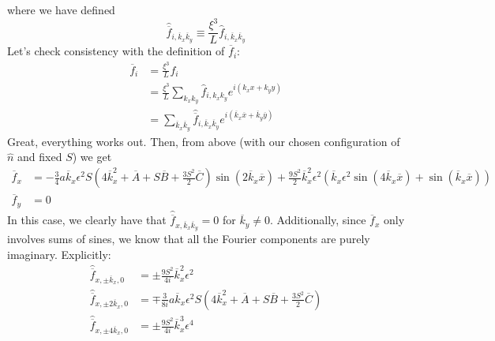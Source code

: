 \documentclass[reqno]{article}
\begin{document}
	where we have defined
	\begin{equation}
		\hat{\overline{f}}_{i, \overline{k}_x \overline{k}_y} 
		\equiv \frac{\xi^3}{L} \hat{f}_{i, \overline{k}_x \overline{k}_y}
	\end{equation}
	Let's check consistency with the definition of $\overline{f}_i$:
	\begin{equation}
	\begin{split}
		\overline{f}_i
		&= \frac{\xi^3}{L} f_i \\
		&= \frac{\xi^3}{L} \sum_{k_x k_y}
		\hat{f}_{i, k_x k_y} e^{i\left( k_x x + k_y y \right)} \\
		&= \sum_{\overline{k}_x \overline{k}_y}
		\hat{\overline{f}}_{i, \overline{k}_x \overline{k}_y}
		e^{i \left( \overline{k}_x \overline{x} + \overline{k}_y \overline{y} \right)}
	\end{split}
	\end{equation}
	Great, everything works out. 
	Then, from above (with our chosen configuration of $\hat{n}$ and fixed $S$) we get
	\begin{equation}
	\begin{split}
		\overline{f}_x
		&= -\tfrac34 a \overline{k}_x \epsilon^2 S \left( 
		4 \overline{k}_x^2
		+ \overline{A} 
		+ S\overline{B}
		+ \frac{3 S^2}{2} \overline{C}
		\right) 
		\sin \left(
		2 \overline{k}_x \overline{x}
		\right)
		+ \frac{9 S^2}{2}\overline{k}_x^2 \epsilon^2
		\left(
		\overline{k}_x \epsilon^2 \sin \left(
		4 \overline{k}_x \overline{x}
		\right)
		+ \sin \left(
		\overline{k}_x \overline{x}
		\right)
		\right) \\
		\overline{f}_y
		&= 0
	\end{split}
	\end{equation}
	In this case, we clearly have that $\hat{\overline{f}}_{x, \overline{k}_x \overline{k}_y} = 0$ for $\overline{k}_y \neq 0$. Additionally, since $\overline{f}_x$ only involves sums of sines, we know that all the Fourier components are purely imaginary. Explicitly:
	\begin{equation}
	\begin{split}
		\hat{\overline{f}}_{x, \pm\overline{k}_x, 0}
		&= \pm\frac{9 S^2}{4i} \overline{k}_x^2 \epsilon^2 \\
		\hat{\overline{f}}_{x, \pm 2 \overline{k}_x, 0}
		&= \mp\frac{3}{8i} a \overline{k}_x \epsilon^2 S \left(
		4 \overline{k}_x^2 
		+ \overline{A} 
		+ S \overline{B}
		+ \frac{3 S^2}{2} \overline{C}
		\right) \\
		\hat{\overline{f}}_{x, \pm 4\overline{k}_x, 0}
		&= \pm \frac{9 S^2}{4i} \overline{k}_x^3 \epsilon^4 \\
	\end{split}
	\end{equation}
\end{document}
